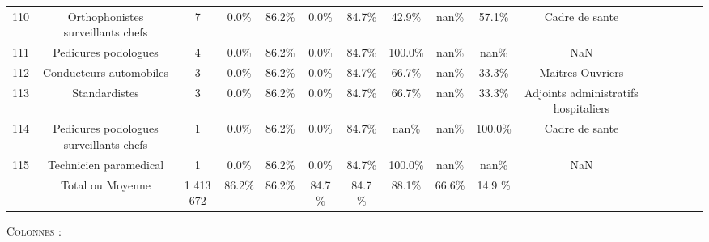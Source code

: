 \documentclass[10pt]{article}
\begin{document}
\begin{landscape}
\begin{longtable}{ | p{0.5cm} |*{15}{c|} }
110 &                  Orthophonistes surveillants chefs &              7 &           0.0\% &                  86.2\% &                 0.0\% &                    84.7\% &              42.9\% &                              nan\% &                                    57.1\% &                                     Cadre de sante \\
111 &                               Pedicures podologues &              4 &           0.0\% &                  86.2\% &                 0.0\% &                    84.7\% &             100.0\% &                              nan\% &                                     nan\% &                                                NaN \\
112 &                            Conducteurs automobiles &              3 &           0.0\% &                  86.2\% &                 0.0\% &                    84.7\% &              66.7\% &                              nan\% &                                    33.3\% &                                   Maitres Ouvriers \\
113 &                                      Standardistes &              3 &           0.0\% &                  86.2\% &                 0.0\% &                    84.7\% &              66.7\% &                              nan\% &                                    33.3\% &               Adjoints administratifs hospitaliers \\
114 &            Pedicures podologues surveillants chefs &              1 &           0.0\% &                  86.2\% &                 0.0\% &                    84.7\% &               nan\% &                              nan\% &                                   100.0\% &                                     Cadre de sante \\
115 &                             Technicien paramedical &              1 &           0.0\% &                  86.2\% &                 0.0\% &                    84.7\% &             100.0\% &                              nan\% &                                     nan\% &                                                NaN \\
	    &                              Total ou Moyenne				 &      1 413 672 & 86.2\% & 86.2\% & 84.7 \% & 84.7 \% & 88.1\% & 66.6\% & 14.9 \%
	\end{longtable}
\indent \textsc{Colonnes :}


\end{landscape}
\end{document}
